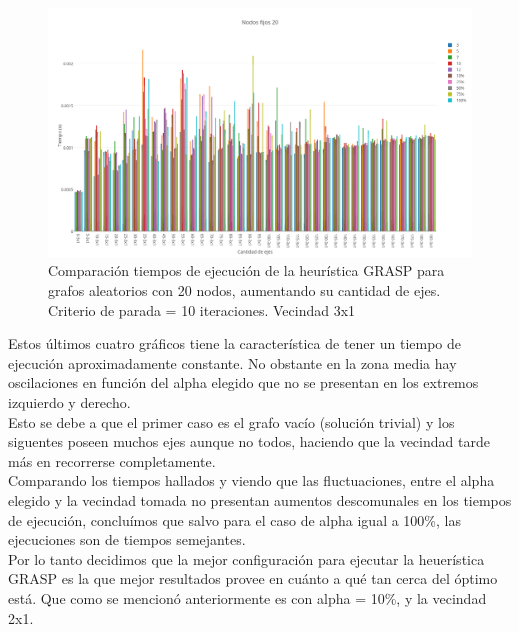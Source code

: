   \begin{figure}[h!]
   \begin{center}
 	\includegraphics[scale=0.35]{imagenes/grasp/20nodos-10repes-v2.png}
 	\caption{Comparaci\'on tiempos de ejecuci\'on de la heur\'istica GRASP para grafos aleatorios con 20 nodos, aumentando su cantidad de ejes. Criterio de parada = 10 iteraciones. Vecindad 3x1}
   \end{center}
 \end{figure}
\newpage

Estos \'ultimos cuatro gr\'aficos tiene la caracter\'istica de tener un tiempo de ejecuci\'on aproximadamente constante. No obstante en la zona media hay oscilaciones en funci\'on del alpha elegido que no se presentan en los extremos izquierdo y derecho.\\

Esto se debe a que el primer caso es el grafo vac\'io (soluci\'on trivial) y los siguentes poseen muchos ejes aunque no todos, haciendo que la vecindad tarde m\'as en recorrerse completamente.\\

Comparando los tiempos hallados y viendo que las fluctuaciones, entre el alpha elegido y la vecindad tomada no presentan aumentos descomunales en los tiempos de ejecuci\'on, conclu\'imos que salvo para el caso de alpha igual a 100\%, las ejecuciones son de tiempos semejantes.\\

Por lo tanto decidimos que la mejor configuraci\'on para ejecutar la heuer\'istica GRASP es la que mejor resultados provee en cu\'anto a qu\'e tan cerca del \'optimo est\'a. Que como se mencion\'o anteriormente es con alpha = 10\%, y la vecindad 2x1.

